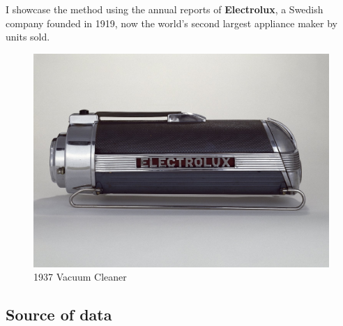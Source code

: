 \documentclass[
  letterpaper,
  DIV=11,
  numbers=noendperiod]{scrartcl}
\begin{document}
I showcase the method using the annual reports of \textbf{Electrolux}, a
Swedish company founded in 1919, now the world's second largest
appliance maker by units sold.

\begin{figure}

{\centering \includegraphics{assets/vacuum.jpg}

}

\caption{1937 Vacuum Cleaner}

\end{figure}

\hypertarget{source-of-data}{%
\subsection{Source of data}\label{source-of-data}}
\end{document}
